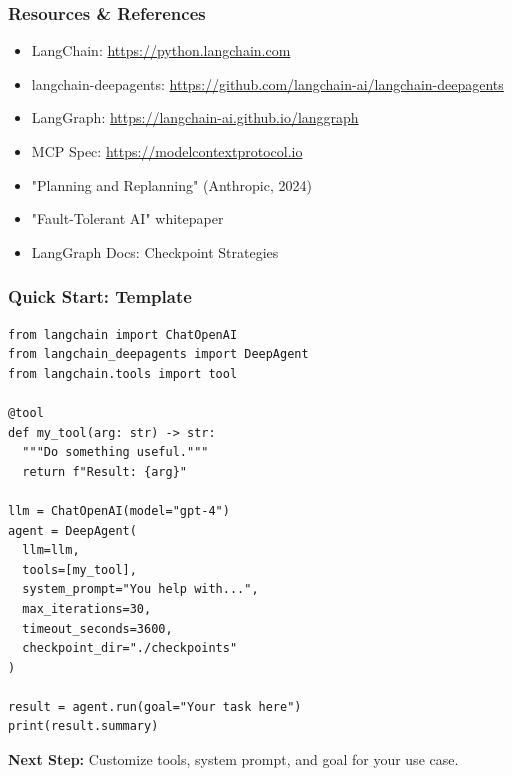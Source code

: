 \documentclass[aspectratio=169,11pt]{beamer}
\begin{document}
\begin{frame}[fragile]
\frametitle{Resources \& References}

\begin{tipbox}
\begin{itemize}
    \setlength{\itemsep}{1pt}
  \item LangChain: \url{https://python.langchain.com}
  \item langchain-deepagents: \url{https://github.com/langchain-ai/langchain-deepagents}
  \item LangGraph: \url{https://langchain-ai.github.io/langgraph}
  \item MCP Spec: \url{https://modelcontextprotocol.io}
\end{itemize}
\end{tipbox}

\begin{tipbox}
\begin{itemize}
    \setlength{\itemsep}{1pt}
  \item "Planning and Replanning" (Anthropic, 2024)
  \item "Fault-Tolerant AI" whitepaper
  \item LangGraph Docs: Checkpoint Strategies
\end{itemize}
\end{tipbox}

\end{frame}

\begin{frame}[fragile]
\frametitle{Quick Start: Template}

\begin{lstlisting}
from langchain import ChatOpenAI
from langchain_deepagents import DeepAgent
from langchain.tools import tool

@tool
def my_tool(arg: str) -> str:
  """Do something useful."""
  return f"Result: {arg}"

llm = ChatOpenAI(model="gpt-4")
agent = DeepAgent(
  llm=llm,
  tools=[my_tool],
  system_prompt="You help with...",
  max_iterations=30,
  timeout_seconds=3600,
  checkpoint_dir="./checkpoints"
)

result = agent.run(goal="Your task here")
print(result.summary)
\end{lstlisting}

\textcolor{lcblue}{\textbf{Next Step:}} Customize tools, system prompt, and goal for your use case.

\end{frame}
\end{document}
